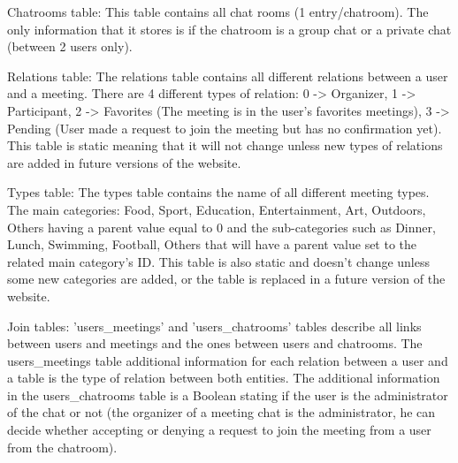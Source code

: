 \documentclass[conference]{IEEEtran}
\begin{document}
Chatrooms table:
This table contains all chat rooms (1 entry/chatroom). The only information that it stores is if the chatroom is a group chat or a private chat (between 2 users only).

Relations table:
The relations table contains all different relations between a user and a meeting. There are 4 different types of relation: 0 -> Organizer, 1 -> Participant, 2 -> Favorites (The meeting is in the user’s favorites meetings), 3 -> Pending (User made a request to join the meeting but has no confirmation yet). This table is static meaning that it will not change unless new types of relations are added in future versions of the website.

Types table:
The types table contains the name of all different meeting types. The main categories: Food, Sport, Education, Entertainment, Art, Outdoors, Others having a parent value equal to 0 and the sub-categories such as Dinner, Lunch, Swimming, Football, Others that will have a parent value set to the related main category’s ID. This table is also static and doesn’t change unless some new categories are added, or the table is replaced in a future version of the website.

Join tables:
'users\_meetings' and 'users\_chatrooms' tables describe all links between users and meetings and the ones between users and chatrooms. The users\_meetings table additional information for each relation between a user and a table is the type of relation between both entities. The additional information in the users\_chatrooms table is a Boolean stating if the user is the administrator of the chat or not (the organizer of a meeting chat is the administrator, he can decide whether accepting or denying a request to join the meeting from a user from the chatroom).
\end{document}
